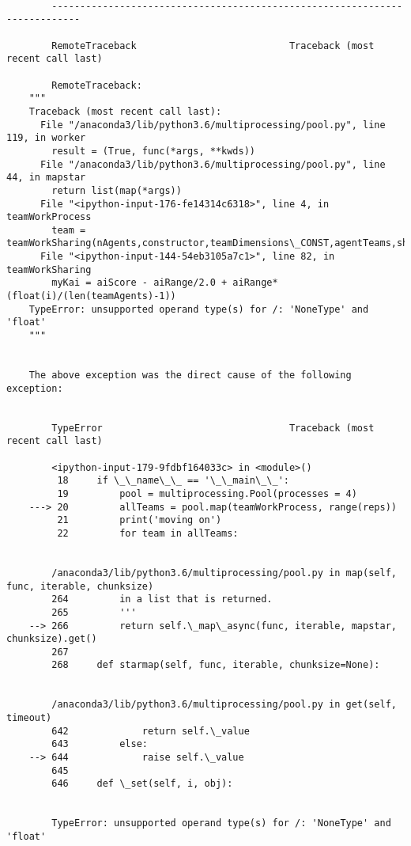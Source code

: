 \documentclass[11pt]{article}
\begin{document}
    \begin{Verbatim}[commandchars=\\\{\}]

        ---------------------------------------------------------------------------

        RemoteTraceback                           Traceback (most recent call last)

        RemoteTraceback: 
    """
    Traceback (most recent call last):
      File "/anaconda3/lib/python3.6/multiprocessing/pool.py", line 119, in worker
        result = (True, func(*args, **kwds))
      File "/anaconda3/lib/python3.6/multiprocessing/pool.py", line 44, in mapstar
        return list(map(*args))
      File "<ipython-input-176-fe14314c6318>", line 4, in teamWorkProcess
        team = teamWorkSharing(nAgents,constructor,teamDimensions\_CONST,agentTeams,showViz=showViz,speed=None,pComm=pComm,steps=steps,groupConformityBias=True,soBias=True,aiScore=aiScore,aiRange=aiRange,curatedTeams=curatedTeams)
      File "<ipython-input-144-54eb3105a7c1>", line 82, in teamWorkSharing
        myKai = aiScore - aiRange/2.0 + aiRange*(float(i)/(len(teamAgents)-1))
    TypeError: unsupported operand type(s) for /: 'NoneType' and 'float'
    """

        
    The above exception was the direct cause of the following exception:


        TypeError                                 Traceback (most recent call last)

        <ipython-input-179-9fdbf164033c> in <module>()
         18     if \_\_name\_\_ == '\_\_main\_\_':
         19         pool = multiprocessing.Pool(processes = 4)
    ---> 20         allTeams = pool.map(teamWorkProcess, range(reps))
         21         print('moving on')
         22         for team in allTeams:


        /anaconda3/lib/python3.6/multiprocessing/pool.py in map(self, func, iterable, chunksize)
        264         in a list that is returned.
        265         '''
    --> 266         return self.\_map\_async(func, iterable, mapstar, chunksize).get()
        267 
        268     def starmap(self, func, iterable, chunksize=None):


        /anaconda3/lib/python3.6/multiprocessing/pool.py in get(self, timeout)
        642             return self.\_value
        643         else:
    --> 644             raise self.\_value
        645 
        646     def \_set(self, i, obj):


        TypeError: unsupported operand type(s) for /: 'NoneType' and 'float'

    \end{Verbatim}
\end{document}
